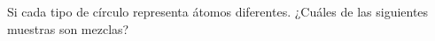 Si cada tipo de círculo representa átomos diferentes. ¿Cuáles de las siguientes muestras son mezclas?
\begin{center}
\end{center}
